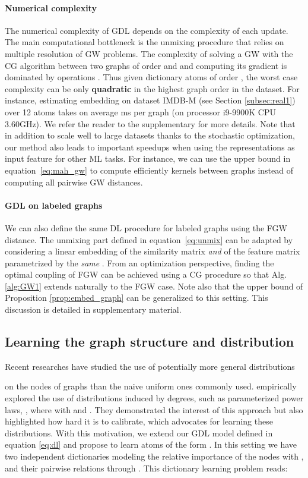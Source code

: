 \documentclass{article}
\def\eqref#1{equation~\ref{#1}}
\begin{document}
	\paragraph{Numerical complexity} The numerical complexity of GDL depends on the complexity of each update. The main computational bottleneck is the unmixing procedure that relies on multiple resolution of GW
	problems. The complexity of solving a GW with the {CG} algorithm between two graphs of order  and  and computing
	its gradient is dominated by   operations
	\cite{peyre2016gromov,vayer-fused-2018}.
	Thus given dictionary
	atoms of order , the worst case complexity 
	can be only \textbf{quadratic} in
	the highest graph order in the dataset.  For instance, estimating embedding on dataset IMDB-M (see Section \ref{subsec:real1}) over 12 atoms takes on average  ms per graph (on processor i9-9900K CPU 3.60GHz). {We refer the reader to the
		supplementary for more details.}
	Note that in addition to scale well to large datasets thanks to the stochastic
	optimization, our method also leads to important speedups when using the
	representations as input feature for other ML tasks. For instance, we can use the upper bound in
	\eqref{eq:mah_gw} to compute efficiently kernels between graphs instead of
	computing all pairwise GW distances.
	\paragraph{GDL on labeled graphs}{We can also define the same DL procedure for labeled graphs using the FGW distance. The unmixing part defined in \eqref{eq:unmix} can be adapted by considering a linear embedding of the similarity matrix \emph{and} of the feature matrix parametrized by the \emph{same} . From an optimization perspective, finding the optimal coupling of FGW can be achieved  using a CG procedure so that Alg.\ref{alg:GW1} extends naturally to the FGW case. Note also that the upper bound
		of Proposition \ref{prop:embed_graph} can be generalized to this setting. This discussion is
		detailed in supplementary material.}
	
	\subsection{Learning the graph structure and distribution}
	\label{subsec:GW_subgrad}
	
	Recent researches have studied the use of potentially more general distributions
	
	on the nodes of graphs than the naive uniform ones commonly used. \citep{xu2019scalable} empirically explored the use of distributions induced by
	degrees, such as parameterized power
	laws, , where  with  and . They demonstrated the interest of this approach but also highlighted how hard it is to calibrate, which {advocates for learning these distributions.}
	With this motivation, we extend our GDL model defined in
	equation \ref{eq:dl} and propose to learn atoms of the form . In this setting we have
	two independent dictionaries modeling the relative importance of the nodes with
	, and their pairwise relations through . This
	dictionary learning problem reads:
	
\end{document}
